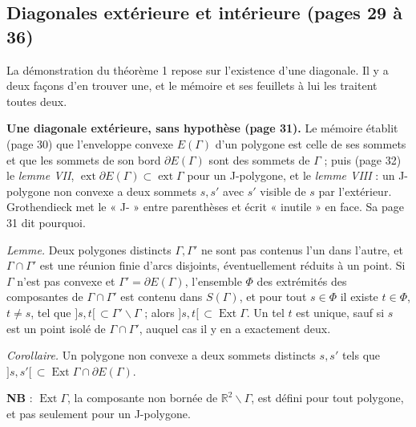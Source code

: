 \documentclass[11pt,a4paper]{article}
\begin{document}
\subsection*{Diagonales extérieure et intérieure (pages 29 à 36)}

La démonstration du théorème 1 repose sur l'existence d'une diagonale. Il y a
deux façons d'en trouver une, et le mémoire et ses feuillets à lui les
traitent toutes deux.

\textbf{Une diagonale extérieure, sans hypothèse (page 31).} Le mémoire établit
(page 30) que l'enveloppe convexe $E(\Gamma)$ d'un polygone est celle de ses
sommets et que les sommets de son bord $\partial E(\Gamma)$ sont des sommets de
$\Gamma$ ; puis (page 32) le \emph{lemme VII}, $\operatorname{ext}\partial
E(\Gamma) \subset \operatorname{ext}\Gamma$ pour un J-polygone, et le
\emph{lemme VIII} : un J-polygone non convexe a deux sommets $s, s'$ avec $s'$
visible de $s$ par l'extérieur. Grothendieck met le « J- » entre parenthèses et
écrit « inutile » en face. Sa page 31 dit pourquoi.

\emph{Lemme.} Deux polygones distincts $\Gamma, \Gamma'$ ne sont pas contenus
l'un dans l'autre, et $\Gamma \cap \Gamma'$ est une réunion finie d'arcs
disjoints, éventuellement réduits à un point. Si $\Gamma$ n'est pas convexe et
$\Gamma' = \partial E(\Gamma)$, l'ensemble $\Phi$ des extrémités des
composantes de $\Gamma \cap \Gamma'$ est contenu dans $S(\Gamma)$, et pour tout
$s \in \Phi$ il existe $t \in \Phi$, $t \neq s$, tel que $]s, t[\, \subset
\Gamma' \smallsetminus \Gamma$ ; alors $]s, t[\, \subset
\operatorname{Ext}\Gamma$. Un tel $t$ est unique, sauf si $s$ est un point isolé
de $\Gamma \cap \Gamma'$, auquel cas il y en a exactement deux.

\emph{Corollaire.} Un polygone non convexe a deux sommets distincts $s, s'$
tels que $]s, s'[\, \subset \operatorname{Ext}\Gamma \cap \partial E(\Gamma)$.

\textbf{NB} : $\operatorname{Ext}\Gamma$, la composante non bornée de
$\mathbb{R}^2 \smallsetminus \Gamma$, est défini pour tout polygone, et pas
seulement pour un J-polygone.
\end{document}
